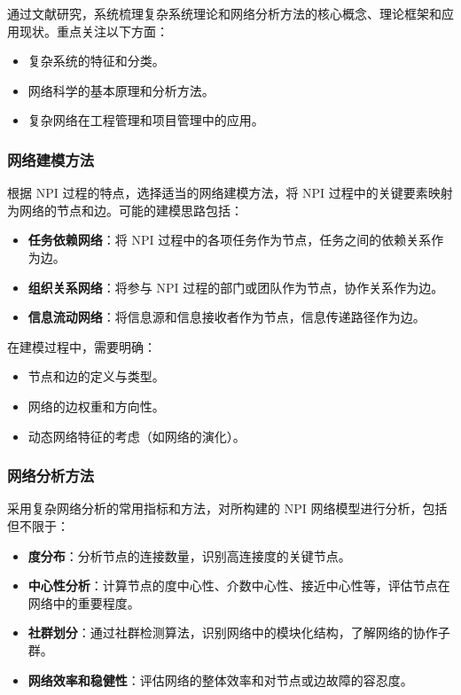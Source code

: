 通过文献研究，系统梳理复杂系统理论和网络分析方法的核心概念、理论框架和应用现状。重点关注以下方面：

\begin{itemize}
  \item 复杂系统的特征和分类\citep{mitchell2009complexity}。
  \item 网络科学的基本原理和分析方法\citep{newman2010networks, barabasiNetworkScience2013}。
  \item 复杂网络在工程管理和项目管理中的应用\citep{wang2015complex}。
\end{itemize}

\subsubsection{网络建模方法}

根据 NPI 过程的特点，选择适当的网络建模方法，将 NPI 过程中的关键要素映射为网络的节点和边。可能的建模思路包括：

\begin{itemize}
  \item \textbf{任务依赖网络}：将 NPI 过程中的各项任务作为节点，任务之间的依赖关系作为边\citep{browning2001applying}。
  \item \textbf{组织关系网络}：将参与 NPI 过程的部门或团队作为节点，协作关系作为边\citep{reagans2001networks}。
  \item \textbf{信息流动网络}：将信息源和信息接收者作为节点，信息传递路径作为边\citep{sosa2004misalignment}。
\end{itemize}


在建模过程中，需要明确：

\begin{itemize}
  \item 节点和边的定义与类型。
  \item 网络的边权重和方向性。
  \item 动态网络特征的考虑（如网络的演化）。
\end{itemize}

\subsubsection{网络分析方法}

采用复杂网络分析的常用指标和方法，对所构建的 NPI 网络模型进行分析，包括但不限于：

\begin{itemize}
  \item \textbf{度分布}：分析节点的连接数量，识别高连接度的关键节点\citep{albert2002statistical}。
  \item \textbf{中心性分析}：计算节点的度中心性、介数中心性、接近中心性等，评估节点在网络中的重要程度\citep{freeman1978centrality}。
  \item \textbf{社群划分}：通过社群检测算法，识别网络中的模块化结构，了解网络的协作子群\citep{girvan2002community}。
  \item \textbf{网络效率和稳健性}：评估网络的整体效率和对节点或边故障的容忍度\citep{latora2001efficient}。
\end{itemize}

